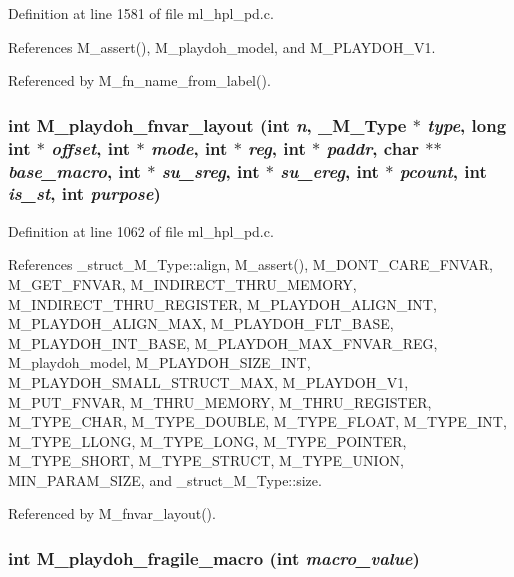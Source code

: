 Definition at line 1581 of file ml\_\-hpl\_\-pd.c.

References M\_\-assert(), M\_\-playdoh\_\-model, and M\_\-PLAYDOH\_\-V1.

Referenced by M\_\-fn\_\-name\_\-from\_\-label().
\subsubsection{\setlength{\rightskip}{0pt plus 5cm}int M\_\-playdoh\_\-fnvar\_\-layout (int {\em n}, \bf{\_\-M\_\-Type} $\ast$ {\em type}, long int $\ast$ {\em offset}, int $\ast$ {\em mode}, int $\ast$ {\em reg}, int $\ast$ {\em paddr}, char $\ast$$\ast$ {\em base\_\-macro}, int $\ast$ {\em su\_\-sreg}, int $\ast$ {\em su\_\-ereg}, int $\ast$ {\em pcount}, int {\em is\_\-st}, int {\em purpose})}\label{ml__hpl__pd_8c_c9828dfc92b0accba1a7a207e1b499d4}




Definition at line 1062 of file ml\_\-hpl\_\-pd.c.

References \_\-struct\_\-M\_\-Type::align, M\_\-assert(), M\_\-DONT\_\-CARE\_\-FNVAR, M\_\-GET\_\-FNVAR, M\_\-INDIRECT\_\-THRU\_\-MEMORY, M\_\-INDIRECT\_\-THRU\_\-REGISTER, M\_\-PLAYDOH\_\-ALIGN\_\-INT, M\_\-PLAYDOH\_\-ALIGN\_\-MAX, M\_\-PLAYDOH\_\-FLT\_\-BASE, M\_\-PLAYDOH\_\-INT\_\-BASE, M\_\-PLAYDOH\_\-MAX\_\-FNVAR\_\-REG, M\_\-playdoh\_\-model, M\_\-PLAYDOH\_\-SIZE\_\-INT, M\_\-PLAYDOH\_\-SMALL\_\-STRUCT\_\-MAX, M\_\-PLAYDOH\_\-V1, M\_\-PUT\_\-FNVAR, M\_\-THRU\_\-MEMORY, M\_\-THRU\_\-REGISTER, M\_\-TYPE\_\-CHAR, M\_\-TYPE\_\-DOUBLE, M\_\-TYPE\_\-FLOAT, M\_\-TYPE\_\-INT, M\_\-TYPE\_\-LLONG, M\_\-TYPE\_\-LONG, M\_\-TYPE\_\-POINTER, M\_\-TYPE\_\-SHORT, M\_\-TYPE\_\-STRUCT, M\_\-TYPE\_\-UNION, MIN\_\-PARAM\_\-SIZE, and \_\-struct\_\-M\_\-Type::size.

Referenced by M\_\-fnvar\_\-layout().
\subsubsection{\setlength{\rightskip}{0pt plus 5cm}int M\_\-playdoh\_\-fragile\_\-macro (int {\em macro\_\-value})}\label{ml__hpl__pd_8c_b08feb4f13bb726b71a4be96a8a9d95c}




